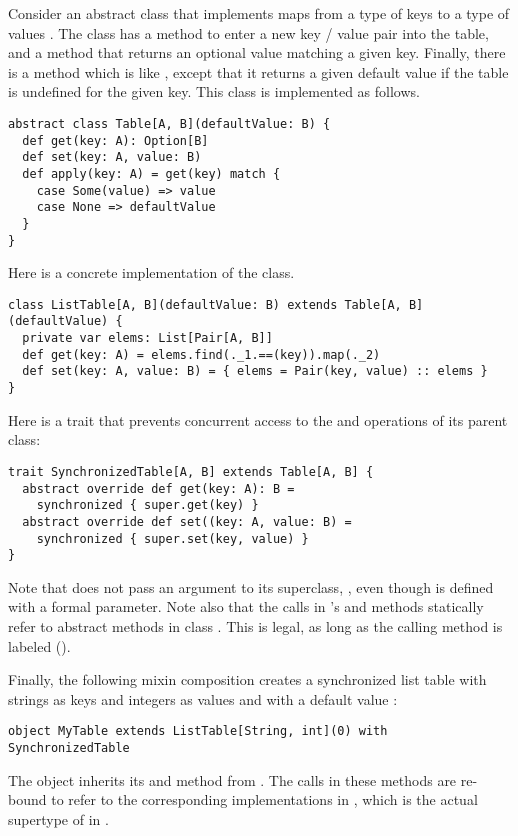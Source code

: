 \example Consider an abstract class  that implements maps
from a type of keys  to a type of values . The class
has a method  to enter a new key / value pair into the table,
and a method  that returns an optional value matching a
given key. Finally, there is a method  which is like
, except that it returns a given default value if the table
is undefined for the given key. This class is implemented as follows.
\begin{lstlisting}
abstract class Table[A, B](defaultValue: B) {
  def get(key: A): Option[B]
  def set(key: A, value: B)
  def apply(key: A) = get(key) match {
    case Some(value) => value
    case None => defaultValue
  }
}
\end{lstlisting}
Here is a concrete implementation of the  class.
\begin{lstlisting}
class ListTable[A, B](defaultValue: B) extends Table[A, B](defaultValue) {
  private var elems: List[Pair[A, B]]
  def get(key: A) = elems.find(._1.==(key)).map(._2)
  def set(key: A, value: B) = { elems = Pair(key, value) :: elems }
}
\end{lstlisting}
Here is a trait that prevents concurrent access to the
 and  operations of its parent class:
\begin{lstlisting}
trait SynchronizedTable[A, B] extends Table[A, B] {
  abstract override def get(key: A): B = 
    synchronized { super.get(key) }
  abstract override def set((key: A, value: B) = 
    synchronized { super.set(key, value) }
}

\end{lstlisting}
Note that  does not pass an argument to
its superclass, , even  though  is defined with a
formal parameter. Note also that the  calls
in 's  and  methods
statically refer to abstract methods in class . This is
legal, as long as the calling method is labeled 
 ().

Finally, the following mixin composition creates a synchronized list table
with strings as keys and integers as values and with a default value :
\begin{lstlisting}
object MyTable extends ListTable[String, int](0) with SynchronizedTable
\end{lstlisting}
The object  inherits its  and 
method from .  The  calls in these
methods are re-bound to refer to the corresponding implementations in
, which is the actual supertype of  
in . 

